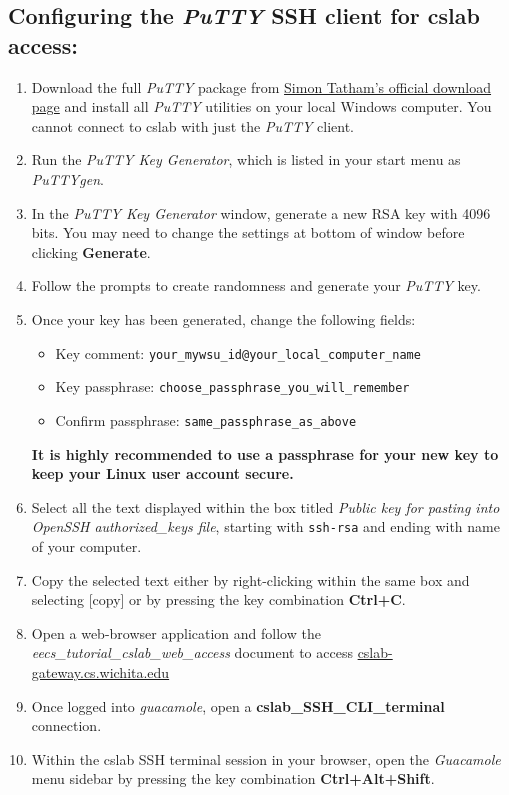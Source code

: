 \documentclass[12pt]{article}
\begin{document}
\begin{flushleft}
\subsection*{Configuring the \textit{PuTTY} SSH client for cslab access:}
\begin{enumerate}
  \item Download the full \textit{PuTTY} package from \href{https://www.chiark.greenend.org.uk/~sgtatham/putty/latest.html}{Simon Tatham's official download page} and install all \textit{PuTTY} utilities on your local Windows computer. You cannot connect to cslab with just the \textit{PuTTY} client.
  \item Run the \textit{PuTTY Key Generator}, which is listed in your start menu as \textit{PuTTYgen}.
  \item In the \textit{PuTTY Key Generator} window, generate a new RSA key with 4096 bits. You may need to change the settings at bottom of window before clicking \textbf{Generate}.
  \item Follow the prompts to create randomness and generate your \textit{PuTTY} key.
  \item Once your key has been generated, change the following fields:
    \begin{itemize}
    \item Key comment: \verb|your_mywsu_id@your_local_computer_name|
    \item Key passphrase: \verb|choose_passphrase_you_will_remember|
    \item Confirm passphrase: \verb|same_passphrase_as_above|
    \end{itemize}
    \textbf{It is highly recommended to use a passphrase for your new key to keep your Linux user account secure.}
  \item Select all the text displayed within the box titled \textit{Public key for pasting into OpenSSH authorized\_keys file}, starting with \texttt{ssh-rsa} and ending with name of your computer.
  \item Copy the selected text either by right-clicking within the same box and selecting [copy] or by pressing the key combination \textbf{Ctrl+C}.
  \item Open a web-browser application and follow the \textit{eecs\_tutorial\_cslab\_web\_access} document to access \href{https://cslab-gateway.cs.wichita.edu/}{cslab-gateway.cs.wichita.edu}
  \item Once logged into \textit{guacamole}, open a \textbf{cslab\_SSH\_CLI\_terminal} connection.
  \item Within the cslab SSH terminal session in your browser, open the \textit{Guacamole} menu sidebar by pressing the key combination \textbf{Ctrl+Alt+Shift}.

\end{enumerate}
\end{flushleft}
\end{document}
